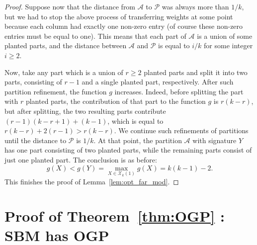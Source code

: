 \documentclass[a4paper,UKenglish,cleveref, autoref, thm-restate,numberwithinsect]{lipics-v2021}
\newcommand{\cA}{\mathcal{A}}
\newcommand{\cP}{\mathcal{P}}
\begin{document}
\begin{proof}
Suppose now that the distance from $\cA$ to $\cP$ was always more than $1/k$, but we had to stop the above process of transferring weights at some point because each column had exactly one non-zero entry (of course these non-zero entries must be equal to one). This means that each part of $\cA$ is a union of some planted parts, and the distance between $\cA$ and $\cP$ is equal to $i/k$ for some integer $i \ge 2$. 

Now, take any part which is a union of $r \ge 2$ planted parts and split it into two parts, consisting of $r-1$ and a single planted part, respectively. After such partition refinement, the function $g$ increases. Indeed, before splitting the part with $r$ planted parts, the contribution of that part to the function $g$ is $r(k-r)$, but after splitting, the two resulting parts contribute $(r-1)(k-r+1)+(k-1)$, which is equal to $r(k-r) + 2(r-1) > r(k-r)$. We continue such refinements of partitions until the distance to $\cP$ is $1/k$. At that point, the partition $\cA$ with signature $Y$ has one part consisting of two planted parts, while the remaining parts consist of just one planted part. The conclusion is as before: 
$$
g(X) < g(Y) = \max_{X\in \mathcal{X}_k(1)} g(X) = k(k-1)-2.
$$
This finishes the proof of Lemma~\ref{lem:opt_far_mod}. 
\end{proof}







\section{Proof of Theorem~\ref{thm:OGP} : SBM has OGP}


\label{app:proof-OGP}
\end{document}
